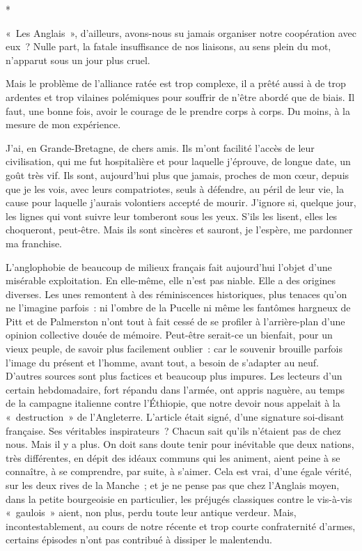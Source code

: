 \documentclass[french,twoside]{book} %
\begin{document}
\begin{center}
*\end{center}
\noindent « Les Anglais », d’ailleurs, avons-nous su jamais organiser notre coopération avec eux ? Nulle part,   la fatale insuffisance de nos liaisons, au sens plein du mot, n’apparut sous un jour plus cruel.\par
Mais le problème de l’alliance ratée est trop complexe, il a prêté aussi à de trop ardentes et trop vilaines polémiques pour souffrir de n’être abordé que de biais. Il faut, une bonne fois, avoir le courage de le prendre corps à corps. Du moins, à la mesure de mon expérience.\par
J’ai, en Grande-Bretagne, de chers amis. Ils m’ont facilité l’accès de leur civilisation, qui me fut hospitalière et pour laquelle j’éprouve, de longue date, un goût très vif. Ils sont, aujourd’hui plus que jamais, proches de mon cœur, depuis que je les vois, avec leurs compatriotes, seuls à défendre, au péril de leur vie, la cause pour laquelle j’aurais volontiers accepté de mourir. J’ignore si, quelque jour, les lignes qui vont suivre leur tomberont sous les yeux. S’ils les lisent, elles les choqueront, peut-être. Mais ils sont sincères et sauront, je l’espère, me pardonner ma franchise.\par
L’anglophobie de beaucoup de milieux français fait aujourd’hui l’objet d’une misérable exploitation. En elle-même, elle n’est pas niable. Elle a des origines diverses. Les unes remontent à des réminiscences historiques, plus tenaces qu’on ne l’imagine parfois : ni l’ombre de la Pucelle ni même les fantômes hargneux de Pitt et de Palmerston n’ont tout à fait cessé de se profiler à l’arrière-plan d’une opinion collective douée de mémoire. Peut-être serait-ce un bienfait, pour un vieux peuple, de savoir plus facilement oublier : car le souvenir brouille parfois l’image du présent et l’homme, avant tout, a besoin de s’adapter au neuf. D’autres sources sont plus factices et beaucoup plus impures. Les lecteurs d’un certain hebdomadaire, fort répandu dans l’armée, ont appris naguère, au temps de la campagne italienne contre l’Éthiopie, que notre devoir nous appelait à la « destruction » de l’Angleterre. L’article était   signé, d’une signature soi-disant française. Ses véritables inspirateurs ? Chacun sait qu’ils n’étaient pas de chez nous. Mais il y a plus. On doit sans doute tenir pour inévitable que deux nations, très différentes, en dépit des idéaux communs qui les animent, aient peine à se connaître, à se comprendre, par suite, à s’aimer. Cela est vrai, d’une égale vérité, sur les deux rives de la Manche ; et je ne pense pas que chez l’Anglais moyen, dans la petite bourgeoisie en particulier, les préjugés classiques contre le vis-à-vis « gaulois » aient, non plus, perdu toute leur antique verdeur. Mais, incontestablement, au cours de notre récente et trop courte confraternité d’armes, certains épisodes n’ont pas contribué à dissiper le malentendu.\par
\end{document}
